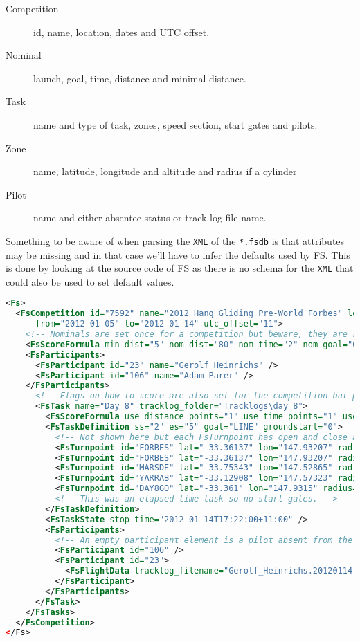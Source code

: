 \documentclass[gap.tex]{subfiles}
\begin{document}
\begin{description}
    \item[Competition] id, name, location, dates and UTC offset.
    \item[Nominal] launch, goal, time, distance and minimal distance.
    \item[Task] name and type of task, zones, speed section, start gates and pilots.
    \item[Zone] name, latitude, longitude and altitude and radius if a cylinder
    \item[Pilot] name and either absentee status or track log file name.
\end{description}

Something to be aware of when parsing the \texttt{XML} of the \texttt{*.fsdb}
is that attributes may be missing and in that case we'll have to infer the
defaults used by FS. This is done by looking at the source code of FS as there
is no schema for the \texttt{XML} that could also be used to set default
values.

\begin{lstlisting}[language=XML, caption={Overall *.fsdb structure, filtered for input.}]
<Fs>
  <FsCompetition id="7592" name="2012 Hang Gliding Pre-World Forbes" location="Forbes, Australia"
      from="2012-01-05" to="2012-01-14" utc_offset="11">
    <!-- Nominals are set once for a competition but beware, they are repeated per task. -->
    <FsScoreFormula min_dist="5" nom_dist="80" nom_time="2" nom_goal="0.2" />
    <FsParticipants>
      <FsParticipant id="23" name="Gerolf Heinrichs" />
      <FsParticipant id="106" name="Adam Parer" />
    </FsParticipants>
      <!-- Flags on how to score are also set for the competition but pick them up from the task. -->
      <FsTask name="Day 8" tracklog_folder="Tracklogs\day 8">
        <FsScoreFormula use_distance_points="1" use_time_points="1" use_departure_points="0" use_leading_points="1" use_arrival_position_points="1" use_arrival_time_points="0" />
        <FsTaskDefinition ss="2" es="5" goal="LINE" groundstart="0">
          <!-- Not shown here but each FsTurnpoint has open and close attributes. -->
          <FsTurnpoint id="FORBES" lat="-33.36137" lon="147.93207" radius="100" />
          <FsTurnpoint id="FORBES" lat="-33.36137" lon="147.93207" radius="10000" />
          <FsTurnpoint id="MARSDE" lat="-33.75343" lon="147.52865" radius="5000" />
          <FsTurnpoint id="YARRAB" lat="-33.12908" lon="147.57323" radius="400" />
          <FsTurnpoint id="DAY8GO" lat="-33.361" lon="147.9315" radius="400" />
          <!-- This was an elapsed time task so no start gates. -->
        </FsTaskDefinition>
        <FsTaskState stop_time="2012-01-14T17:22:00+11:00" />
        <FsParticipants>
          <!-- An empty participant element is a pilot absent from the task. -->
          <FsParticipant id="106" />
          <FsParticipant id="23">
            <FsFlightData tracklog_filename="Gerolf_Heinrichs.20120114-100859.6405.23.kml" />
          </FsParticipant>
        </FsParticipants>
      </FsTask>
    </FsTasks>
  </FsCompetition>
</Fs>
\end{lstlisting}
\end{document}
